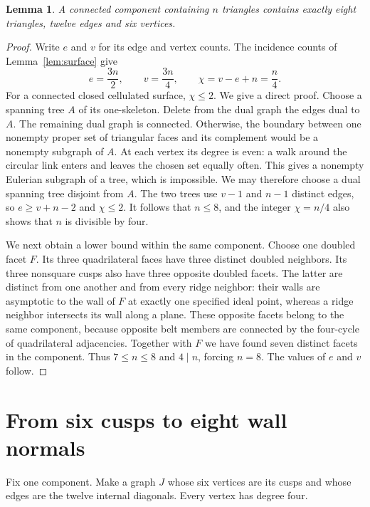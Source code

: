 \documentclass[11pt]{article}
\newtheorem{lemma}[theorem]{Lemma}
\theoremstyle{remark}
\begin{document}
\begin{lemma}\label{lem:euler}
A connected component containing $n$ triangles contains exactly
eight triangles, twelve edges and six vertices.
\end{lemma}
\begin{proof}
Write $e$ and $v$ for its edge and vertex counts. The incidence
counts of Lemma~\ref{lem:surface} give
\[
 e=\frac{3n}{2},\qquad v=\frac{3n}{4},\qquad
 \chi=v-e+n=\frac n4.
\]
For a connected closed cellulated surface, $\chi\le2$.
We give a direct proof.
Choose a spanning tree $A$ of its one-skeleton. Delete from the
dual graph the edges dual to $A$. The remaining dual graph is
connected. Otherwise, the boundary between one nonempty proper
set of triangular faces and its complement would be a nonempty
subgraph of $A$. At each vertex its degree is even: a walk around
the circular link enters and leaves the chosen set equally often.
This gives a nonempty Eulerian subgraph of a tree, which is
impossible. We may therefore choose a dual spanning tree disjoint
from $A$. The two trees use $v-1$ and $n-1$ distinct edges, so
$e\ge v+n-2$ and $\chi\le2$. It follows that $n\le8$, and the
integer $\chi=n/4$ also shows that $n$ is divisible by four.

We next obtain a lower bound within the same component. Choose
one doubled facet $F$. Its three quadrilateral faces have three
distinct doubled neighbors. Its three nonsquare cusps also have
three opposite doubled facets. The latter are distinct from one
another and from every ridge neighbor: their walls are asymptotic
to the wall of $F$ at exactly one specified ideal point, whereas
a ridge neighbor intersects its wall along a plane. These opposite
facets belong to the same component, because opposite belt members
are connected by the four-cycle of quadrilateral adjacencies.
Together with $F$ we have found seven distinct facets in the
component. Thus $7\le n\le8$ and $4\mid n$, forcing $n=8$.
The values of $e$ and $v$ follow.
\end{proof}

\section{From six cusps to eight wall normals}

Fix one component. Make a graph $J$ whose six vertices are its
cusps and whose edges are the twelve internal diagonals. Every
vertex has degree four.
\end{document}
